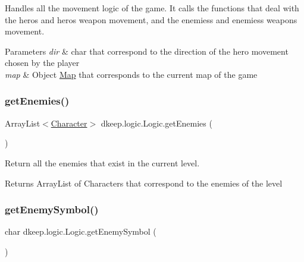Handles all the movement logic of the game. It calls the functions that deal with the hero\textquotesingle{}s and hero\textquotesingle{}s weapon movement, and the enemies\textquotesingle{}s and enemies\textquotesingle{}s weapons movement. 
\begin{DoxyParams}{Parameters}
{\em dir} & char that correspond to the direction of the hero movement chosen by the player \\
\hline
{\em map} & Object \hyperlink{classdkeep_1_1logic_1_1_map}{Map} that corresponds to the current map of the game \\
\hline
\end{DoxyParams}
\mbox{\label{classdkeep_1_1logic_1_1_logic_a2f36d0e37683459a9d26925b66842efb}} 
\subsubsection{\texorpdfstring{get\+Enemies()}{getEnemies()}}
{\footnotesize\ttfamily Array\+List$<$\hyperlink{classdkeep_1_1logic_1_1_character}{Character}$>$ dkeep.\+logic.\+Logic.\+get\+Enemies (\begin{DoxyParamCaption}{ }\end{DoxyParamCaption})}

Return all the enemies that exist in the current level. \begin{DoxyReturn}{Returns}
Array\+List of Characters that correspond to the enemies of the level 
\end{DoxyReturn}
\mbox{\label{classdkeep_1_1logic_1_1_logic_aec99013c9c1b9e5a52615752e1e0a4f2}} 
\subsubsection{\texorpdfstring{get\+Enemy\+Symbol()}{getEnemySymbol()}}
{\footnotesize\ttfamily char dkeep.\+logic.\+Logic.\+get\+Enemy\+Symbol (\begin{DoxyParamCaption}{ }\end{DoxyParamCaption})}

